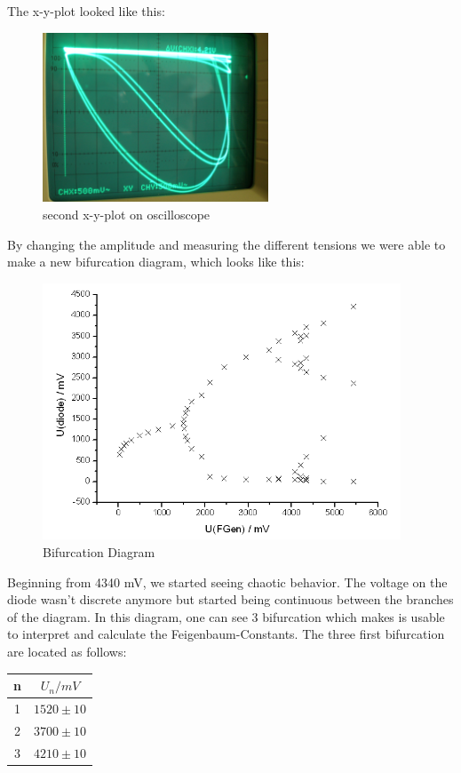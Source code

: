The x-y-plot looked like this:

\begin{figure}[H]
\centering \includegraphics[width= 0.6\textwidth]{Fotos2/01.jpg}
\caption{second x-y-plot on oscilloscope}
\end{figure}

By changing the amplitude and measuring the different tensions we were able to make a new bifurcation diagram, which looks like this:

\begin{figure}[H]
\centering \includegraphics[width= 0.95\textwidth]{Bilder/bifdiag.png}
\caption{Bifurcation Diagram}
\end{figure}

Beginning from 4340 mV, we started seeing chaotic behavior. The voltage on the diode wasn't discrete anymore but started being continuous between the branches of the diagram. In this diagram, one can see 3 bifurcation which makes is usable to interpret and calculate the Feigenbaum-Constants. The three first bifurcation are located as follows:

\begin{center}
\begin{tabular}{c c}
n & $U_n / mV$\\ \hline
1 & $1520 \pm 10$\\
2 & $3700 \pm 10$\\
3 & $4210 \pm 10$
\end{tabular}
\end{center}

